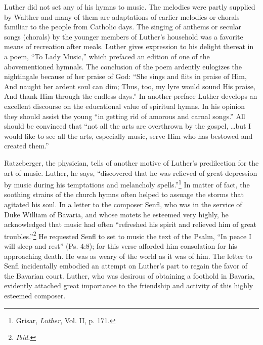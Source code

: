 Luther did not set any of his hymns to music. The melodies were
partly supplied by Walther and many of them are adaptations of earlier
melodies or chorals familiar to the people from Catholic days.
The singing of anthems or secular songs (chorals) by the younger
members of Luther’s household was a favorite means of recreation
after meals. Luther gives expression to his delight thereat in a poem,
“To Lady Music,” which prefaced an edition of one of the abovementioned
hymnals. The conclusion of the poem ardently eulogizes
the nightingale because of her praise of God: “She sings and flits in
praise of Him, And naught her ardent soul can dim; Thus, too, my
lyre would sound His praise, And thank Him through the endless
days.” In another preface Luther develops an excellent discourse on
the educational value of spiritual hymns. In his opinion they should
assist the young “in getting rid of amorous and carnal songs.” All
should be convinced that “not all the arts are overthrown by the
gospel, \dots but I would like to see all the arts, especially music, serve
Him who has bestowed and created them.”

Ratzeberger, the physician, tells of another motive of Luther’s predilection
for the art of music. Luther, he says, “discovered that he was relieved of
great depression by music during his temptations and melancholy
spells.”\footnote{Grisar, \textit{Luther}, Vol. II, p. 171.} In matter of fact,
the soothing strains of the church hymns often helped to assuage the storms
that agitated his soul. In a letter to the composer Senfl, who was in the
service of Duke William of Bavaria, and whose motets he esteemed very highly,
he acknowledged that music had often “refreshed his spirit and relieved him of
great troubles.”\footnote{\textit{Ibid.}} He requested Senfl to set to music
the text of the Psalm, “In peace I will sleep and rest” (Ps. 4:8); for this
verse afforded him consolation for his approaching death. He was as weary of
the world as it was of him. The letter to Senfl incidentally embodied an
attempt on Luther’s part to regain the favor of the Bavarian court. Luther, who
was desirous of obtaining a foothold in Bavaria, evidently attached great
importance to the friendship and activity of this highly esteemed composer.
